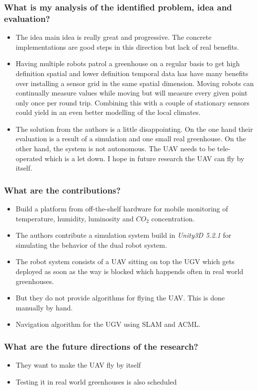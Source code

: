     \subsubsection*{What is my analysis of the identified problem, idea and evaluation?}
    \begin{itemize}
        \item The idea main idea is really great and progressive. The concrete implementations are good steps in this direction but lack of real benefits.
        \item Having multiple robots patrol a greenhouse on a regular basis to get high definition spatial and lower definition temporal data has have many benefits over installing 
        a sensor grid in the same spatial dimension. Moving robots can continually measure values while moving but will measure every given point only once per round trip. Combining this
        with a couple of stationary sensors could yield in an even better modelling of the local climates.
        \item The solution from the authors is a little disappointing. On the one hand their evaluation is a result of a simulation and one small real greenhouse. On the other hand,
        the system is not autonomous. The UAV needs to be tele-operated which is a let down. I hope in future research the UAV can fly by itself.
    \end{itemize}
    \subsubsection*{What are the contributions?}
    \begin{itemize}
        \item Build a platform from off-the-shelf hardware for mobile monitoring of temperature, humidity, luminosity and $CO_2$ concentration.
        \item The authors contribute a simulation system build in \emph{Unity3D 5.2.1} for simulating the behavior of the dual robot system. 
        \item The robot system consists of a UAV sitting on top the UGV which gets deployed as soon as the way is blocked which happends often in real world greenhouses.
        \item But they do not provide algorithms for flying the UAV. This is done manually by hand.
        \item Navigation algorithm for the UGV using SLAM and ACML.
    \end{itemize}
    \subsubsection*{What are the future directions of the research?}
    \begin{itemize}
        \item They want to make the UAV fly by itself
        \item Testing it in real world greenhouses is also scheduled
    \end{itemize}
